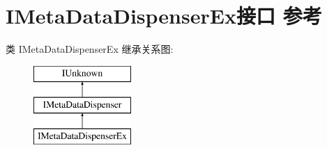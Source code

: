 \hypertarget{interface_i_meta_data_dispenser_ex}{}\section{I\+Meta\+Data\+Dispenser\+Ex接口 参考}
\label{interface_i_meta_data_dispenser_ex}
类 I\+Meta\+Data\+Dispenser\+Ex 继承关系图\+:\begin{figure}[H]
\begin{center}
\leavevmode
\includegraphics[height=3.000000cm]{interface_i_meta_data_dispenser_ex}
\end{center}
\end{figure}
